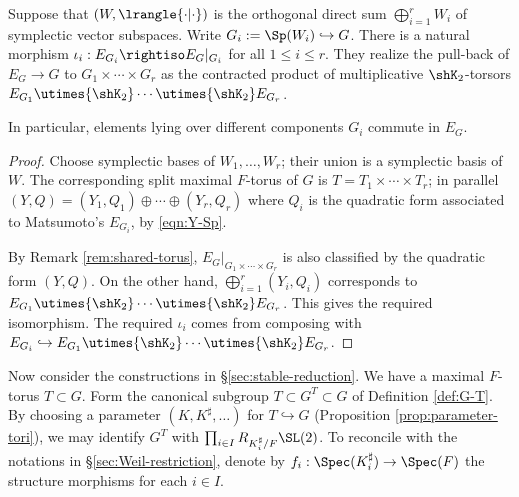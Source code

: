 \documentclass[a4paper,10pt]{article}
\begin{document}
\begin{lemma}\label{prop:restriction-W_i}
	Suppose that $(W, \lrangle{\cdot|\cdot})$ is the orthogonal direct sum $\bigoplus_{i=1}^r W_i$ of symplectic vector subspaces. Write $G_i := \Sp(W_i) \hookrightarrow G$. There is a natural morphism $\iota_i: E_{G_i} \rightiso E_G|_{G_i}$ for all $1 \leq i \leq r$. They realize the pull-back of $E_G \to G$ to $G_1 \times \cdots \times G_r$ as the contracted product of multiplicative $\shK_2$-torsors $E_{G_1} \utimes{\shK_2} \cdots \utimes{\shK_2} E_{G_r}$.
	
	In particular, elements lying over different components $G_i$ commute in $E_G$.
\end{lemma}
\begin{proof}
	Choose symplectic bases of $W_1, \ldots, W_r$; their union is a symplectic basis of $W$. The corresponding split maximal $F$-torus of $G$ is $T = T_1 \times \cdots \times T_r$; in parallel $(Y, Q) = (Y_1, Q_1) \oplus \cdots \oplus (Y_r, Q_r)$ where $Q_i$ is the quadratic form associated to Matsumoto's $E_{G_i}$, by \eqref{eqn:Y-Sp}.

	By Remark \ref{rem:shared-torus}, $E_G|_{G_1 \times \cdots \times G_r}$ is also classified by the quadratic form $(Y, Q)$. On the other hand, $\bigoplus_{i=1}^r (Y_i, Q_i)$ corresponds to $E_{G_1} \utimes{\shK_2} \cdots \utimes{\shK_2} E_{G_r}$. This gives the required isomorphism. The required $\iota_i$ comes from composing with $E_{G_i} \hookrightarrow E_{G_1} \utimes{\shK_2} \cdots \utimes{\shK_2} E_{G_r}$.
\end{proof}

Now consider the constructions in \S\ref{sec:stable-reduction}. We have a maximal $F$-torus $T \subset G$. Form the canonical subgroup $T \subset G^T \subset G$ of Definition \ref{def:G-T}. By choosing a parameter $(K, K^\sharp, \ldots)$ for $T \hookrightarrow G$ (Proposition \ref{prop:parameter-tori}), we may identify $G^T$ with $\prod_{i \in I} R_{K^\sharp_i/F} \SL(2)$. To reconcile with the notations in \S\ref{sec:Weil-restriction}, denote by $f_i: \Spec(K_i^\sharp) \to \Spec(F)$ the structure morphisms for each $i \in I$.
\end{document}
